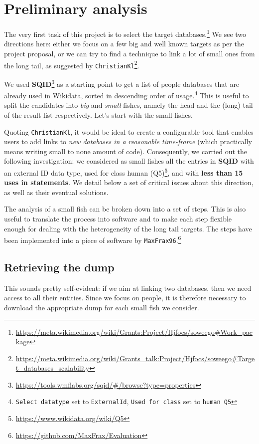\chapter{Preliminary analysis}
\label{cha:2}
The very first task of this project is to select the target databases.\footnote{\url{https://meta.wikimedia.org/wiki/Grants:Project/Hjfocs/soweego\#Work_package}} We see two directions here: either we focus on a few big and well known targets as per the project proposal, or we can try to find a technique to link a lot of small ones from the long tail, as suggested by \texttt{ChristianKl}\footnote{\url{https://meta.wikimedia.org/wiki/Grants_talk:Project/Hjfocs/soweego\#Target_databases_scalability}}.

We used \textbf{SQID}\footnote{\url{https://tools.wmflabs.org/sqid/\#/browse?type=properties}} as a starting point to get a list of people databases that are already used in Wikidata, sorted in descending order of usage.\footnote{\texttt{Select datatype} set to \texttt{ExternalId}, \texttt{Used for class} set to \texttt{human Q5}} This is useful to split the candidates into \textit{big} and \textit{small} fishes, namely the head and the (long) tail of the result list respectively. Let's start with the small fishes.

Quoting \texttt{ChristianKl}, it would be ideal to create a configurable tool that enables users to add links to \textit{new databases in a reasonable time-frame} (which practically means writing small to none amount of code). Consequently, we carried out the following investigation: we considered as small fishes all the entries in \textbf{SQID} with an external ID data type, used for class  human (Q5)\footnote{\url{https://www.wikidata.org/wiki/Q5}}, and with \textbf{less than 15 uses in statements}. We detail below a set of critical issues about this direction, as well as their eventual solutions.

The analysis of a small fish can be broken down into a set of steps. This is also useful to translate the process into software and to make each step flexible enough for dealing with the heterogeneity of the long tail targets. The steps have been implemented into a piece of software by \texttt{MaxFrax96}.\footnote{\url{https://github.com/MaxFrax/Evaluation}}

\section{Retrieving the dump}
\label{cha:21}
This sounds pretty self-evident: if we aim at linking two databases, then we need access to all their entities. Since we focus on people, it is therefore necessary to download the appropriate dump for each small fish we consider.

